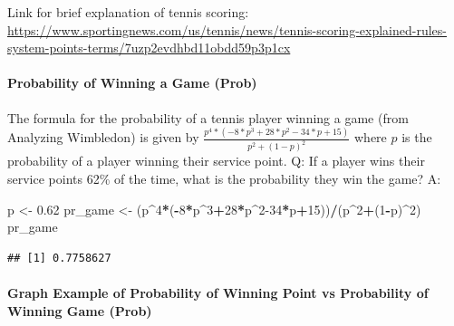 \documentclass[]{article}
\newenvironment{Shaded}{\begin{snugshade}}{\end{snugshade}}
\newcommand{\DecValTok}[1]{\textcolor[rgb]{0.00,0.00,0.81}{#1}}
\newcommand{\FloatTok}[1]{\textcolor[rgb]{0.00,0.00,0.81}{#1}}
\newcommand{\NormalTok}[1]{#1}
\newcommand{\OperatorTok}[1]{\textcolor[rgb]{0.81,0.36,0.00}{\textbf{#1}}}
\newcommand{\StringTok}[1]{\textcolor[rgb]{0.31,0.60,0.02}{#1}}
\let\oldparagraph\paragraph
\renewcommand{\paragraph}[1]{\oldparagraph{#1}\mbox{}}
\begin{document}
Link for brief explanation of tennis scoring:
\url{https://www.sportingnews.com/us/tennis/news/tennis-scoring-explained-rules-system-points-terms/7uzp2evdhbd11obdd59p3p1cx}

\hypertarget{probability-of-winning-a-game-prob}{%
\paragraph{Probability of Winning a Game
(Prob)}\label{probability-of-winning-a-game-prob}}

The formula for the probability of a tennis player winning a game (from
Analyzing Wimbledon) is given by
\(\frac{p^4*(-8*p^3+28*p^2-34*p+15)}{p^2+(1-p)^2}\) where \(p\) is the
probability of a player winning their service point. Q: If a player wins
their service points 62\% of the time, what is the probability they win
the game? A:

\begin{Shaded}
\begin{Highlighting}[]
\NormalTok{p <-}\StringTok{ }\FloatTok{0.62}
\NormalTok{pr_game <-}\StringTok{ }\NormalTok{(p}\OperatorTok{^}\DecValTok{4}\OperatorTok{*}\NormalTok{(}\OperatorTok{-}\DecValTok{8}\OperatorTok{*}\NormalTok{p}\OperatorTok{^}\DecValTok{3}\OperatorTok{+}\DecValTok{28}\OperatorTok{*}\NormalTok{p}\OperatorTok{^}\DecValTok{2-34}\OperatorTok{*}\NormalTok{p}\OperatorTok{+}\DecValTok{15}\NormalTok{))}\OperatorTok{/}\NormalTok{(p}\OperatorTok{^}\DecValTok{2}\OperatorTok{+}\NormalTok{(}\DecValTok{1}\OperatorTok{-}\NormalTok{p)}\OperatorTok{^}\DecValTok{2}\NormalTok{)}
\NormalTok{pr_game}
\end{Highlighting}
\end{Shaded}

\begin{verbatim}
## [1] 0.7758627
\end{verbatim}

\hypertarget{graph-example-of-probability-of-winning-point-vs-probability-of-winning-game-prob}{%
\paragraph{Graph Example of Probability of Winning Point vs Probability
of Winning Game
(Prob)}\label{graph-example-of-probability-of-winning-point-vs-probability-of-winning-game-prob}}
\end{document}
